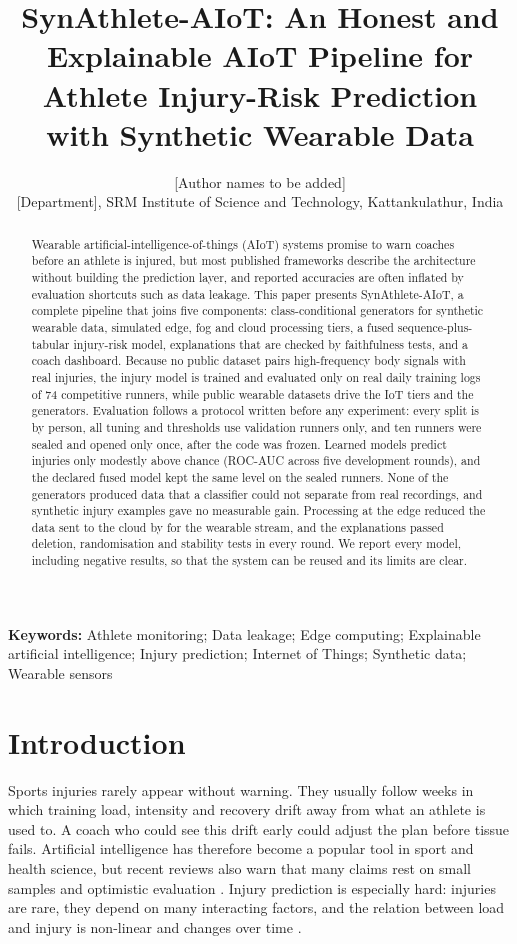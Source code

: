 \documentclass[12pt,a4paper]{article}
\title{\textbf{SynAthlete-AIoT: An Honest and Explainable AIoT Pipeline for Athlete
Injury-Risk Prediction with Synthetic Wearable Data}}
\author{[Author names to be added]\\[2pt]
\small [Department], SRM Institute of Science and Technology, Kattankulathur, India}
\date{}
\begin{document}
\maketitle

\begin{abstract}
\noindent Wearable artificial-intelligence-of-things (AIoT) systems promise to warn coaches
before an athlete is injured, but most published frameworks describe the architecture without
building the prediction layer, and reported accuracies are often inflated by evaluation
shortcuts such as data leakage. This paper presents SynAthlete-AIoT, a complete pipeline that
joins five components: class-conditional generators for synthetic wearable data, simulated
edge, fog and cloud processing tiers, a fused sequence-plus-tabular injury-risk model, explanations
that are checked by faithfulness tests, and a coach dashboard. Because no public dataset pairs
high-frequency body signals with real injuries, the injury model is trained and evaluated only on
real daily training logs of 74 competitive runners, while public wearable datasets drive the IoT
tiers and the generators. Evaluation follows a protocol written before any experiment: every
split is by person, all tuning and thresholds use validation runners only, and ten runners were
sealed and opened only once, after the code was frozen. Learned models predict injuries only
modestly above chance (ROC-AUC \injuryAucRange{} across five development rounds), and the
declared fused model kept the same level on the sealed runners. None of the generators produced
data that a classifier could not separate from real recordings, and synthetic injury examples
gave no measurable gain. Processing at the edge reduced the data sent to the cloud by
\tiersReduction{} for the wearable stream, and the explanations passed deletion, randomisation
and stability tests in every round. We report every model, including negative results, so that
the system can be reused and its limits are clear.
\end{abstract}

\noindent\textbf{Keywords:} Athlete monitoring; Data leakage; Edge computing; Explainable
artificial intelligence; Injury prediction; Internet of Things; Synthetic data; Wearable sensors

\section{Introduction}
Sports injuries rarely appear without warning. They usually follow weeks in which training load,
intensity and recovery drift away from what an athlete is used to. A coach who could see this
drift early could adjust the plan before tissue fails. Artificial intelligence has therefore
become a popular tool in sport and health science, but recent reviews also warn that many claims
rest on small samples and optimistic evaluation \citep{an2025}. Injury prediction is especially
hard: injuries are rare, they depend on many interacting factors, and the relation between load
and injury is non-linear and changes over time \citep{stern2020}.
\end{document}
